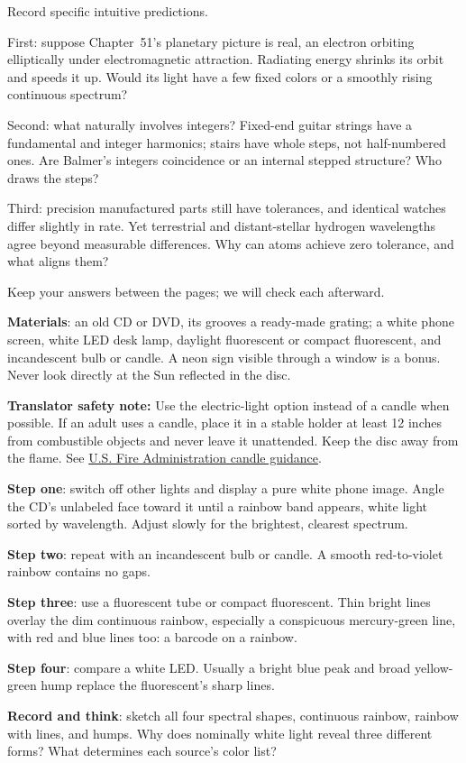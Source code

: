 
Record specific intuitive predictions.

First: suppose Chapter~51's planetary picture is real, an electron orbiting elliptically under electromagnetic attraction. Radiating energy shrinks its orbit and speeds it up. Would its light have a few fixed colors or a smoothly rising continuous spectrum?

Second: what naturally involves integers? Fixed-end guitar strings have a fundamental and integer harmonics; stairs have whole steps, not half-numbered ones. Are Balmer's integers coincidence or an internal stepped structure? Who draws the steps?

Third: precision manufactured parts still have tolerances, and identical watches differ slightly in rate. Yet terrestrial and distant-stellar hydrogen wavelengths agree beyond measurable differences. Why can atoms achieve zero tolerance, and what aligns them?

Keep your answers between the pages; we will check each afterward.


\begin{experiment}
\textbf{Materials}: an old CD or DVD, its grooves a ready-made grating; a white phone screen, white LED desk lamp, daylight fluorescent or compact fluorescent, and incandescent bulb or candle. A neon sign visible through a window is a bonus. Never look directly at the Sun reflected in the disc.

\textbf{Translator safety note:} Use the electric-light option instead of a candle when possible. If an adult uses a candle, place it in a stable holder at least 12 inches from combustible objects and never leave it unattended. Keep the disc away from the flame. See \href{https://www.usfa.fema.gov/prevention/home-fires/prevent-fires/candle/}{U.S. Fire Administration candle guidance}.

\textbf{Step one}: switch off other lights and display a pure white phone image. Angle the CD's unlabeled face toward it until a rainbow band appears, white light sorted by wavelength. Adjust slowly for the brightest, clearest spectrum.

\textbf{Step two}: repeat with an incandescent bulb or candle. A smooth red-to-violet rainbow contains no gaps.

\textbf{Step three}: use a fluorescent tube or compact fluorescent. Thin bright lines overlay the dim continuous rainbow, especially a conspicuous mercury-green line, with red and blue lines too: a barcode on a rainbow.

\textbf{Step four}: compare a white LED. Usually a bright blue peak and broad yellow-green hump replace the fluorescent's sharp lines.

\textbf{Record and think}: sketch all four spectral shapes, continuous rainbow, rainbow with lines, and humps. Why does nominally white light reveal three different forms? What determines each source's color list?
\end{experiment}

